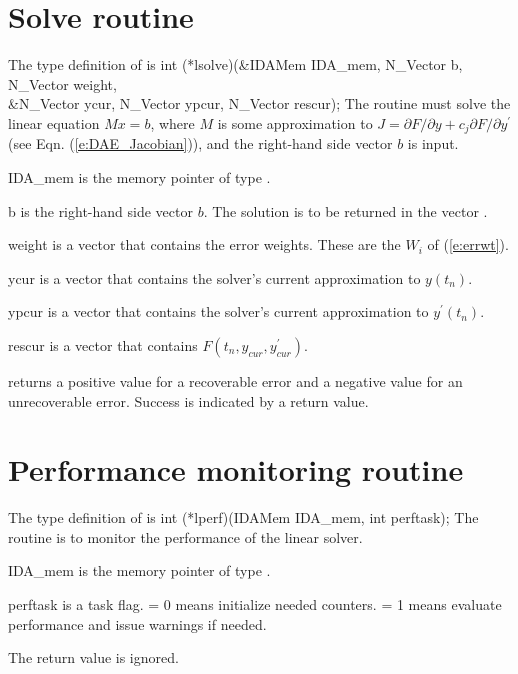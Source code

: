 \section{Solve routine}
The type definition of  is
{
  int (*lsolve)(&IDAMem IDA\_mem, N\_Vector b, N\_Vector weight, \\
                &N\_Vector ycur, N\_Vector ypcur, N\_Vector rescur);  
}
{
  The routine  must solve the linear equation $M x = b$, where         
  $M$ is some approximation to
  $J = \partial F / \partial y + c_j \partial F / \partial y^\prime$  
  (see Eqn. (\ref{e:DAE_Jacobian})), and the right-hand side vector $b$ is input. 
}
{
  \begin{args}
  \item[IDA\_mem]
    is the {\idas} memory pointer of type .
  \item[b]
    is the right-hand side vector $b$. The solution is to be    
    returned in the vector .
  \item[weight]
    is a vector that contains the error weights.
    These are the $W_i$ of (\ref{e:errwt}).
  \item[ycur]
    is a vector that contains the solver's current approximation to $y(t_n)$.
  \item[ypcur]
    is a vector that contains the solver's current approximation to $y^\prime(t_n)$.
  \item[rescur]
    is a vector that contains $F(t_n,y_{cur},y_{cur}^\prime)$. 
  \end{args}
}
{
   returns a positive value    
  for a recoverable error and a negative value for an             
  unrecoverable error. Success is indicated by a  return value.
}
{}


\section{Performance monitoring routine}
The type definition of  is
{
  int (*lperf)(IDAMem IDA\_mem, int perftask);
}
{
  The routine  is to monitor the performance of the linear solver.
}
{
  \begin{args}
  \item[IDA\_mem]
    is the {\idas} memory pointer of type .
  \item[perftask]
    is a task flag.   = 0 means initialize needed counters.
     = 1 means evaluate performance and issue warnings if needed.
  \end{args}
}
{
  The  return value is ignored.
}
{}

